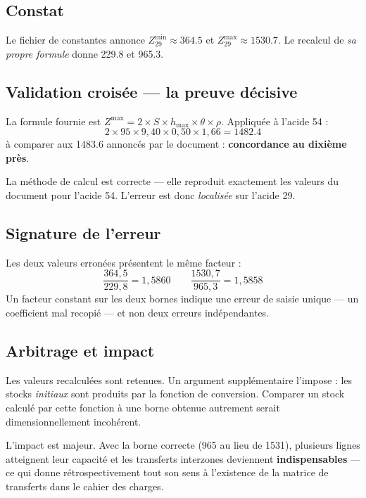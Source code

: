 \subsection{Constat}

Le fichier de constantes annonce $Z^{\min}_{29} \approx \num{364,5}$ et
$Z^{\max}_{29} \approx \num{1530,7}$. Le recalcul de \emph{sa propre formule} donne
\num{229,8} et \num{965,3}.

\subsection{Validation croisée --- la preuve décisive}

La formule fournie est $Z^{\max} = 2 \times S \times h_{\max} \times \theta \times \rho$.
Appliquée à l'acide 54 :
\[
2 \times 95 \times 9{,}40 \times 0{,}50 \times 1{,}66 = \num{1482,4}
\]
à comparer aux \num{1483,6} annoncés par le document : \textbf{concordance au dixième
près}.

\begin{resultat}[title={Conclusion}]
La méthode de calcul est correcte --- elle reproduit exactement les valeurs du document pour
l'acide 54. L'erreur est donc \emph{localisée} sur l'acide 29.
\end{resultat}

\subsection{Signature de l'erreur}

Les deux valeurs erronées présentent le même facteur :
\[
\frac{364{,}5}{229{,}8} = 1{,}5860
\qquad
\frac{1530{,}7}{965{,}3} = 1{,}5858
\]
Un facteur constant sur les deux bornes indique une erreur de saisie unique --- un
coefficient mal recopié --- et non deux erreurs indépendantes.

\subsection{Arbitrage et impact}

Les valeurs recalculées sont retenues. Un argument supplémentaire l'impose : les stocks
\emph{initiaux} sont produits par la fonction de conversion. Comparer un stock calculé par
cette fonction à une borne obtenue autrement serait dimensionnellement incohérent.

L'impact est majeur. Avec la borne correcte (\num{965} au lieu de \num{1531}), plusieurs
lignes atteignent leur capacité et les transferts interzones deviennent
\textbf{indispensables} --- ce qui donne rétrospectivement tout son sens à l'existence de la
matrice de transferts dans le cahier des charges.

